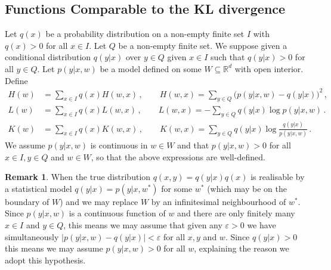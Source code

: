 \documentclass[english,letter paper,12pt,reqno]{article}
\theoremstyle{definition}
\newtheorem{remark}[theorem]{Remark}
\begin{document}
\subsection{Functions Comparable to the KL divergence}
\label{sec:KL_Squared_Distance}

Let $q(x)$ be a probability distribution on a non-empty finite set $I$ with $q(x) > 0$ for all $x \in I$. Let $Q$ be a non-empty finite set. We suppose given a conditional distribution $q(y|x)$ over $y \in Q$ given $x \in I$ such that $q(y|x) > 0$ for all $y \in Q$. Let $p(y|x,w)$ be a model defined on some $W \subseteq \mathbb{R}^d$ with open interior. Define
\begin{align*}
H(w) &= \sum_{x \in I} q(x) H(w,x)\,, \qquad H(w,x) = \sum_{y \in Q}\Big( p( y | x, w) - q(y|x) \Big)^2\,,\\
L(w) &= \sum_{x \in I} q(x) L(w,x)\,, \qquad L(w,x) = - \sum_{y \in Q} q(y|x) \log p(y|x,w) \,.\\
K(w) &= \sum_{x \in I} q(x) K(w,x)\,, \qquad K(w,x) = \sum_{y \in Q} q(y| x)\log\frac{q(y| x)}{p(y| x, w)}\,.
\end{align*}
We assume $p(y|x,w)$ is continuous in $w \in W$ and that $p(y|x,w) > 0$ for all $x \in I, y \in Q$ and $w \in W$, so that the above expressions are well-defined.

\begin{remark}\label{remark:realisable_app}
When the true distribution $q(x,y) = q(y|x) q(x)$ is realisable by a statistical model $q(y|x) = p(y|x,w^*)$ for some $w^*$ (which may be on the boundary of $W$) and we may replace $W$ by an infinitesimal neighbourhood of $w^*$. Since $p(y|x,w)$ is a continuous function of $w$ and there are only finitely many $x \in I$ and $y \in Q$, this means we may assume that given any $\varepsilon > 0$ we have simultaneously $\big| p(y|x,w) - q(y|x) \big| < \varepsilon$ for all $x,y$ and $w$. Since $q(y|x) > 0$ this means we may assume $p(y|x,w) > 0$ for all $w$, explaining the reason we adopt this hypothesis. \end{remark} 
\end{document}
